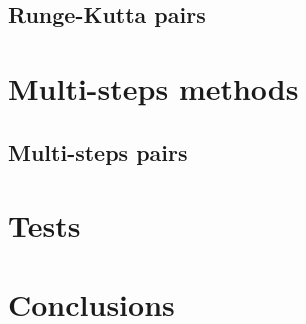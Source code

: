 \documentclass[a4paper]{article}
\begin{document}
\subsection{Runge-Kutta pairs}

\section{Multi-steps methods}

\subsection{Multi-steps pairs}

\section{Tests}

\section{Conclusions}
\end{document}
